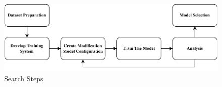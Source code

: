 \begin{figure}[H]
  \centering
  \small
  \includegraphics[width=.9\textwidth]{figures/methods.pdf}
  \caption{Search Steps}
  \label{fig:methods}
\end{figure}
\vspace{-1ex}





